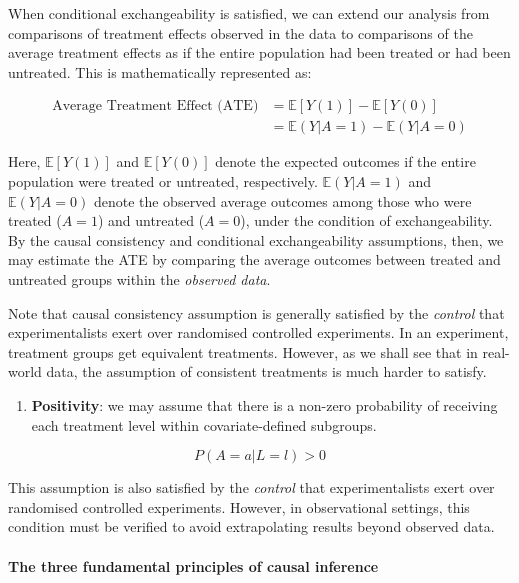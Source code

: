 \documentclass[
  singlecolumn]{article}
\let\oldparagraph\paragraph
\renewcommand{\paragraph}[1]{\oldparagraph{#1}\mbox{}}
\providecommand{\tightlist}{%
  \setlength{\itemsep}{0pt}\setlength{\parskip}{0pt}}\usepackage{longtable,booktabs,array}
\begin{document}
When conditional exchangeability is satisfied, we can extend our
analysis from comparisons of treatment effects observed in the data to
comparisons of the average treatment effects as if the entire population
had been treated or had been untreated. This is mathematically
represented as:

\[
\begin{aligned}
\text{Average Treatment Effect (ATE)} &= \mathbb{E}[Y(1)] - \mathbb{E}[Y(0)] \\
&= \mathbb{E}(Y|A=1) - \mathbb{E}(Y|A=0)
\end{aligned}
\]

Here, \(\mathbb{E}[Y(1)]\) and \(\mathbb{E}[Y(0)]\) denote the expected
outcomes if the entire population were treated or untreated,
respectively. \(\mathbb{E}(Y|A=1)\) and \(\mathbb{E}(Y|A=0)\) denote the
observed average outcomes among those who were treated (\(A=1\)) and
untreated (\(A=0\)), under the condition of exchangeability. By the
causal consistency and conditional exchangeability assumptions, then, we
may estimate the ATE by comparing the average outcomes between treated
and untreated groups within the \emph{observed data}.

Note that causal consistency assumption is generally satisfied by the
\emph{control} that experimentalists exert over randomised controlled
experiments. In an experiment, treatment groups get equivalent
treatments. However, as we shall see that in real-world data, the
assumption of consistent treatments is much harder to satisfy.

\begin{enumerate}
\def\labelenumi{\arabic{enumi}.}
\setcounter{enumi}{2}
\tightlist
\item
  \textbf{Positivity}: we may assume that there is a non-zero
  probability of receiving each treatment level within covariate-defined
  subgroups.
\end{enumerate}

\[ P(A = a | L= l) > 0 \]

This assumption is also satisfied by the \emph{control} that
experimentalists exert over randomised controlled experiments. However,
in observational settings, this condition must be verified to avoid
extrapolating results beyond observed data.

\paragraph{The three fundamental principles of causal
inference}\label{the-three-fundamental-principles-of-causal-inference}
\end{document}

